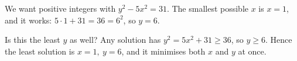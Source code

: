 We want positive integers with $y^2-5x^2=31$. The smallest possible $x$ is $x=1$, and it works: $5\cdot1+31=36=6^2$, so $y=6$.

Is this the least $y$ as well? Any solution has $y^2=5x^2+31\ge36$, so $y\ge6$. Hence the least solution is $\boxed{x=1,\ y=6}$, and it minimises both $x$ and $y$ at once.
